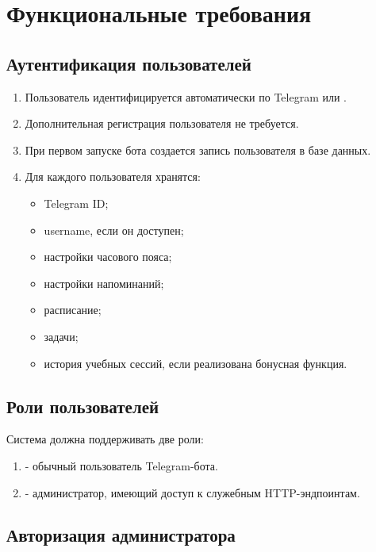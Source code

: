 \documentclass[10pt,a4paper,final]{article} %
\begin{document}
\section{Функциональные требования}

\subsection{Аутентификация пользователей}

\begin{enumerate}[label=\arabic*.]
    \item Пользователь идентифицируется автоматически по Telegram  или .
    \item Дополнительная регистрация пользователя не требуется.
    \item При первом запуске бота создается запись пользователя в базе данных.
    \item Для каждого пользователя хранятся:
    \begin{itemize}
        \item Telegram ID;
        \item username, если он доступен;
        \item настройки часового пояса;
        \item настройки напоминаний;
        \item расписание;
        \item задачи;
        \item история учебных сессий, если реализована бонусная функция.
    \end{itemize}
\end{enumerate}

\subsection{Роли пользователей}

Система должна поддерживать две роли:

\begin{enumerate}
    \item {} - обычный пользователь Telegram-бота.
    \item {} - администратор, имеющий доступ к служебным HTTP-эндпоинтам.
\end{enumerate}

\subsection{Авторизация администратора}
\end{document}
